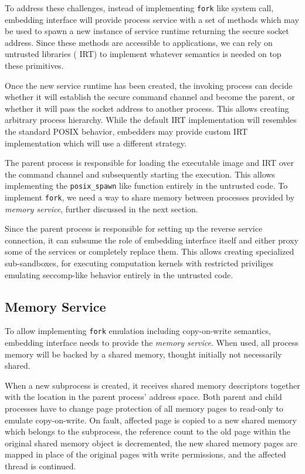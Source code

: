 To address these challenges, instead of implementing \lstinline`fork`
like system call, embedding interface will provide process service  with
a set of methods which may be used to spawn a new instance of
service runtime returning the secure socket address. Since these methods
are accessible to applications, we can rely on untrusted libraries (\eg
IRT) to implement whatever semantics is needed on top these primitives.

Once the new service runtime has been created, the invoking process can
decide whether it will establish the secure command channel and become
the parent, or whether it will pass the socket address to another
process.  This allows creating arbitrary process hierarchy.  While the
default IRT implementation will resembles the standard POSIX behavior,
embedders may provide custom IRT implementation which will use a
different strategy.

The parent process is responsible for loading the executable image and
IRT over the command channel and subsequently starting the execution.
This allows implementing the \lstinline`posix_spawn` like function
entirely in the untrusted code. To implement \lstinline`fork`, we need a
way to share memory between processes provided by \emph{memory service},
further discussed in the next section.

Since the parent process is responsible for setting up the reverse
service connection, it can subsume the role of embedding interface itself
and either proxy some of the services or completely replace them. This
allows creating specialized sub-sandboxes, \eg for executing computation
kernels with restricted priviliges emulating seccomp-like behavior
entirely in the untrusted code.

\subsection{Memory Service}
\label{sub:memory_service}

To allow implementing \lstinline`fork` emulation including copy-on-write
semantics, embedding interface needs to provide the \emph{memory
service}. When used, all process memory will be backed by a shared
memory, thought initially not necessarily shared.

When a new subprocess is created, it receives shared memory descriptors
together with the location in the parent process' address space. Both
parent and child processes have to change page protection of all memory
pages to read-only to emulate copy-on-write. On fault, affected page is
copied to a new shared memory which belongs to the subprocess, the
reference count to the old page within the original shared memory object
is decremented, the new shared memory pages are mapped in place of the
original pages with write permissions, and the affected thread is
continued.

